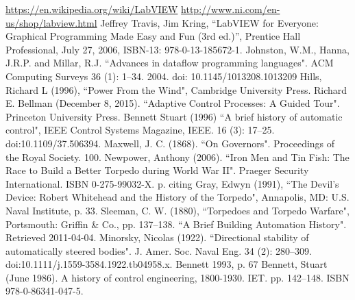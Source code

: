 
\begin{thebibliography}{99}

 \url{https://en.wikipedia.org/wiki/LabVIEW}
 \url{http://www.ni.com/en-us/shop/labview.html}
 Jeffrey Travis, Jim Kring, “LabVIEW for Everyone: Graphical Programming Made Easy and Fun (3rd ed.)”, Prentice Hall Professional, July 27, 2006, ISBN-13: 978-0-13-185672-1.
 Johnston, W.M., Hanna, J.R.P. and Millar, R.J. ``Advances in dataflow programming languages". ACM Computing Surveys 36 (1): 1–34. 2004. doi: 10.1145/1013208.1013209
 Hills, Richard L (1996), ``Power From the Wind", Cambridge University Press.
 Richard E. Bellman (December 8, 2015). ``Adaptive Control Processes: A Guided Tour". Princeton University Press.
 Bennett Stuart (1996) ``A brief history of automatic control", IEEE Control Systems Magazine, IEEE. 16 (3): 17–25. doi:10.1109/37.506394.
 Maxwell, J. C. (1868). ``On Governors". Proceedings of the Royal Society. 100.
 Newpower, Anthony (2006). ``Iron Men and Tin Fish: The Race to Build a Better Torpedo during World War II". Praeger Security International. ISBN 0-275-99032-X. p.  citing Gray, Edwyn (1991), ``The Devil's Device: Robert Whitehead and the History of the Torpedo", Annapolis, MD: U.S. Naval Institute, p. 33.
 Sleeman, C. W. (1880), ``Torpedoes and Torpedo Warfare", Portsmouth: Griffin & Co., pp. 137–138.
 ``A Brief Building Automation History". Retrieved 2011-04-04.
 Minorsky, Nicolas (1922). ``Directional stability of automatically steered bodies". J. Amer. Soc. Naval Eng. 34 (2): 280–309. doi:10.1111/j.1559-3584.1922.tb04958.x.
 Bennett 1993, p. 67
 Bennett, Stuart (June 1986). A history of control engineering, 1800-1930. IET. pp. 142–148. ISBN 978-0-86341-047-5.




\end{thebibliography}

